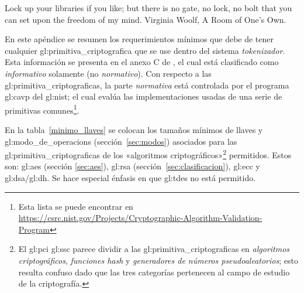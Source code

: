 %
%

{
  \epigrafe
  {%
    Lock up your libraries if you like; but there is no gate, no lock, no bolt
    that you can set upon the freedom of my mind.%
  }
  {%
    Virginia Woolf, A Room of One's Own.%
  }
}

En este apéndice se resumen los requerimientos mínimos que debe de tener
cualquier \gls{gl:primitiva_criptografica} que se use dentro del sistema
\textit{tokenizador}. Esta información se presenta en el anexo C de
\cite{pci_tokens}, el cual está clasificado como \textit{informativo} solamente
(no \textit{normativo}). Con respecto a las \glspl{gl:primitiva_criptografica},
la parte \textit{normativa} está controlada por el programa \gls{gl:cavp} del
\gls{gl:nist}; el cual evalúa las implementaciones usadas de una serie de
primitivas comunes\footnote{Esta lista se puede encontrar en
\url{https://csrc.nist.gov/Projects/Cryptographic-Algorithm-Validation-Program}}.

En la tabla~\ref{minimo_llaves} se colocan los tamaños mínimos de llaves y
\glspl{gl:modo_de_operacion} (sección~\ref{sec:modos}) asociados
para las \glspl{gl:primitiva_criptografica} de los «algoritmos
criptográficos»\footnote{El \gls{gl:pci} \gls{gl:ssc} parece dividir a las
\glspl{gl:primitiva_criptografica} en \textit{algoritmos criptográficos},
\textit{funciones hash} y \textit{generadores de números pseudoaleatorios};
esto resulta confuso dado que las tres categorías pertenecen al campo de
estudio de la criptografía.} permitidos. Estos son: \gls{gl:aes} (sección
\ref{sec:aes}), \gls{gl:rsa} (sección~\ref{sec:clasificacion}), \gls{gl:ecc} y
\gls{gl:dsa}/\gls{gl:dh}. Se hace especial énfasis en que \gls{gl:tdes} no
está permitido.


